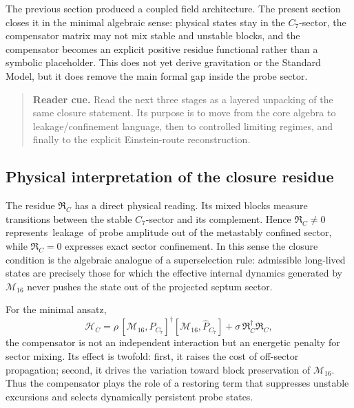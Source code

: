\begin{remark}
The previous section produced a coupled field architecture.
The present section closes it in the minimal algebraic sense:
physical states stay in the $C_7$-sector, the compensator matrix may not
mix stable and unstable blocks, and the compensator becomes an explicit
positive residue functional rather than a symbolic placeholder.
This does not yet derive gravitation or the Standard Model, but it does
remove the main formal gap inside the probe sector.
\end{remark}

\begin{quote}\small
\noindent\textbf{Reader cue.} Read the next three stages as a layered unpacking of the same closure statement. Its purpose is to move from the core algebra to leakage/confinement language, then to controlled limiting regimes, and finally to the explicit Einstein-route reconstruction.
\end{quote}

\subsection*{Physical interpretation of the closure residue}

\begin{remark}
The residue $\mathfrak R_C$ has a direct physical reading.
Its mixed blocks measure transitions between the stable $C_7$-sector and
its complement.
Hence $\mathfrak R_C\neq 0$ represents \,leakage\, of probe amplitude out
of the metastably confined sector, while $\mathfrak R_C=0$ expresses exact
sector confinement.
In this sense the closure condition is the algebraic analogue of a
superselection rule: admissible long-lived states are precisely those for
which the effective internal dynamics generated by $\mathcal M_{16}$ never
pushes the state out of the projected septum sector.
\end{remark}

\begin{remark}
For the minimal ansatz,
\[
 \mathcal H_C
 = \rho\,[\mathcal M_{16},\hat P_{C_7}]^\dagger[\mathcal M_{16},\hat P_{C_7}]
 + \sigma\,\mathfrak R_C^\dagger\mathfrak R_C,
\]
the compensator is not an independent interaction but an energetic penalty
for sector mixing.
Its effect is twofold:
first, it raises the cost of off-sector propagation; second, it drives the
variation toward block preservation of $\mathcal M_{16}$.
Thus the compensator plays the role of a restoring term that suppresses
unstable excursions and selects dynamically persistent probe states.
\end{remark}

